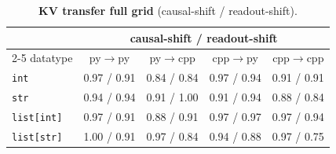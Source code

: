 \begin{table}[ht]\centering\small
\begin{tabular}{lcccc}
\toprule
& \multicolumn{4}{c}{causal-shift / readout-shift} \\
\cmidrule(lr){2-5}
datatype & py$\to$py & py$\to$cpp & cpp$\to$py & cpp$\to$cpp \\
\midrule
\texttt{int} & 0.97 / 0.91 & 0.84 / 0.84 & 0.97 / 0.94 & 0.91 / 0.91 \\
\texttt{str} & 0.94 / 0.94 & 0.91 / 1.00 & 0.91 / 0.94 & 0.88 / 0.84 \\
\texttt{list[int]} & 0.97 / 0.91 & 0.88 / 0.91 & 0.97 / 0.97 & 0.97 / 0.94 \\
\texttt{list[str]} & 1.00 / 0.91 & 0.97 / 0.84 & 0.94 / 0.88 & 0.97 / 0.75 \\
\bottomrule
\end{tabular}
\caption{\textbf{KV transfer full grid} (causal-shift / readout-shift).}
\label{tab:kv-grid}
\end{table}
